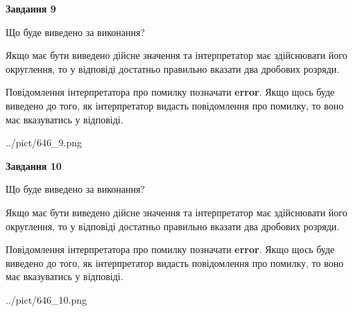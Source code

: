 \documentclass[12pt, ukrainian]{article}
\begin{document}
{\begin {Large}
{\begin {center}\textbf{Завдання 9}\end {center}}\par
Що буде виведено за виконання? \par

Якщо має бути виведено дійсне значення та інтерпретатор має здійснювати його округлення, 
то у відповіді достатньо правильно вказати два дробових розряди.

Повідомлення інтерпретатора про помилку позначати \textbf{error}.
Якщо щось буде виведено до того, як інтерпретатор видасть повідомлення про помилку, 
то воно має вказуватись у відповіді. \par

\begin{center}
	{../pict/646_9.png}
\end{center}
\newpage

{\begin {center}\textbf{Завдання 10}\end {center}}\par
Що буде виведено за виконання? \par

Якщо має бути виведено дійсне значення та інтерпретатор має здійснювати його округлення, 
то у відповіді достатньо правильно вказати два дробових розряди.

Повідомлення інтерпретатора про помилку позначати \textbf{error}.
Якщо щось буде виведено до того, як інтерпретатор видасть повідомлення про помилку, 
то воно має вказуватись у відповіді. \par

\begin{center}
	{../pict/646_10.png}
\end{center}
\newpage

\end {Large}}
\end{document}
